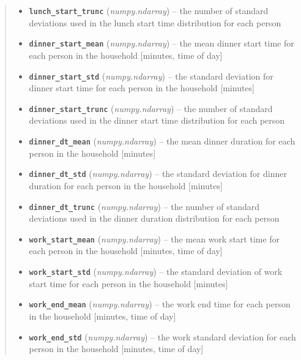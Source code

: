 \documentclass[letterpaper,10pt,english]{sphinxmanual}
\begin{document}
\begin{fulllineitems}
\begin{quote}
\begin{description}
\begin{itemize}
\item {} 
\textbf{\texttt{lunch\_start\_trunc}} (\emph{numpy.ndarray}) -- the number of standard deviations used in the lunch start time     distribution for each person

\item {} 
\textbf{\texttt{dinner\_start\_mean}} (\emph{numpy.ndarray}) -- the mean dinner start time for each person in the household     {[}minutes, time of day{]}

\item {} 
\textbf{\texttt{dinner\_start\_std}} (\emph{numpy.ndarray}) -- the standard deviation for dinner start time for each person in the     household {[}minutes{]}

\item {} 
\textbf{\texttt{dinner\_start\_trunc}} (\emph{numpy.ndarray}) -- the number of standard deviations used in the dinner start time     distribution for each person

\item {} 
\textbf{\texttt{dinner\_dt\_mean}} (\emph{numpy.ndarray}) -- the mean dinner duration for each person in the household {[}minutes{]}

\item {} 
\textbf{\texttt{dinner\_dt\_std}} (\emph{numpy.ndarray}) -- the standard deviation for dinner duration for each person in the     household {[}minutes{]}

\item {} 
\textbf{\texttt{dinner\_dt\_trunc}} (\emph{numpy.ndarray}) -- the number of standard deviations used in the dinner duration     distribution for each person

\item {} 
\textbf{\texttt{work\_start\_mean}} (\emph{numpy.ndarray}) -- the mean work start time for each person in the household     {[}minutes, time of day{]}

\item {} 
\textbf{\texttt{work\_start\_std}} (\emph{numpy.ndarray}) -- the standard deviation of work start time for each person in the     household {[}minutes{]}

\item {} 
\textbf{\texttt{work\_end\_mean}} (\emph{numpy.ndarray}) -- the work end time for each person in the household {[}minutes, time of day{]}

\item {} 
\textbf{\texttt{work\_end\_std}} (\emph{numpy.ndarray}) -- the work standard deviation for each person in the household     {[}minutes, time of day{]}


\end{itemize}
\end{description}
\end{quote}
\end{fulllineitems}
\end{document}
